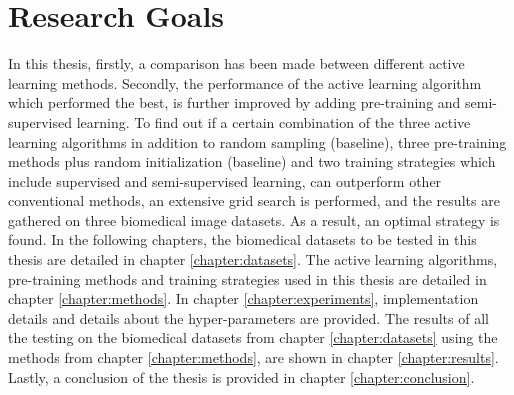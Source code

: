 \section{Research Goals}
In this thesis, firstly, a comparison has been made between different active learning methods. Secondly, the performance of the active learning algorithm which performed the best, is further improved by adding pre-training and semi-supervised learning. To find out if a certain combination of the three active learning algorithms in addition to random sampling (baseline), three pre-training methods plus random initialization (baseline) and two training strategies which include supervised and semi-supervised learning, can outperform other conventional methods, an extensive grid search is performed, and the results are gathered on three biomedical image datasets. As a result, an optimal strategy is found. In the following chapters, the biomedical datasets to be tested in this thesis are detailed in chapter \ref{chapter:datasets}. The active learning algorithms, pre-training methods and training strategies used in this thesis are detailed in chapter \ref{chapter:methods}. In chapter \ref{chapter:experiments}, implementation details and details about the hyper-parameters are provided. The results of all the testing on the biomedical datasets from chapter \ref{chapter:datasets} using the methods from chapter \ref{chapter:methods}, are shown in chapter \ref{chapter:results}. Lastly, a conclusion of the thesis is provided in chapter \ref{chapter:conclusion}.